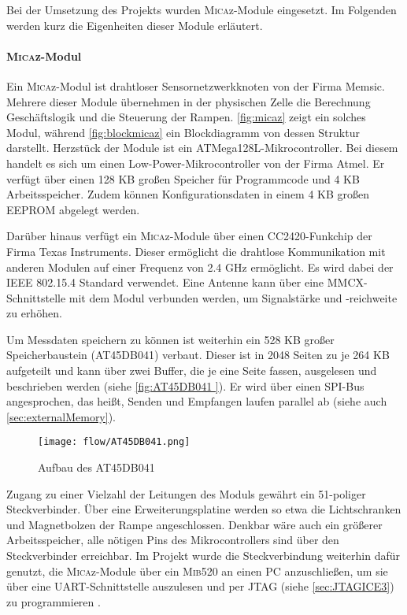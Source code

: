 Bei der Umsetzung des Projekts wurden \textsc{Mica}z-Module eingesetzt. Im Folgenden werden kurz die Eigenheiten dieser Module erläutert.

\paragraph{\textsc{Mica}z-Modul}
Ein \textsc{Mica}z-Modul ist drahtloser Sensornetzwerkknoten von der Firma Memsic. Mehrere dieser Module übernehmen in der physischen Zelle die Berechnung Geschäftslogik und die Steuerung der Rampen. \autoref{fig:micaz} zeigt ein solches Modul, während \autoref{fig:blockmicaz}  ein Blockdiagramm von dessen Struktur darstellt. Herzstück der Module ist ein ATMega128L-Mikrocontroller. Bei diesem handelt es sich um einen Low-Power-Mikrocontroller von der Firma Atmel. Er verfügt  über einen 128 KB großen Speicher für Programmcode und 4 KB Arbeitsspeicher. Zudem können Konfigurationsdaten in einem 4 KB großen EEPROM abgelegt werden.

Darüber hinaus verfügt ein \textsc{Mica}z-Module über einen CC2420-Funkchip der Firma Texas Instruments. Dieser ermöglicht die drahtlose Kommunikation mit anderen Modulen auf einer Frequenz von 2.4 GHz ermöglicht. Es wird dabei der IEEE 802.15.4 Standard verwendet. Eine Antenne kann über eine MMCX-Schnittstelle mit dem Modul verbunden werden, um Signalstärke und -reichweite zu erhöhen. 

Um Messdaten speichern zu können ist weiterhin ein 528 KB großer Speicherbaustein (AT45DB041) verbaut. Dieser ist in 2048 Seiten zu je 264 KB aufgeteilt und kann über zwei Buffer, die je eine Seite fassen, ausgelesen und beschrieben werden (siehe \autoref{fig:AT45DB041 }). Er wird über einen SPI-Bus angesprochen, das heißt, Senden und Empfangen laufen parallel ab (siehe auch \autoref{sec:externalMemory}).

\begin{figure}[th]
	\centering
		\texttt{[image: flow/AT45DB041.png]}
	\caption{Aufbau des AT45DB041 \cite{AT45DB041A:2014:Online}}
	\label{fig:AT45DB041 }
\end{figure}

Zugang zu einer Vielzahl der Leitungen des Moduls gewährt ein 51-poliger Steckverbinder. Über eine Erweiterungsplatine werden so etwa die Lichtschranken und Magnetbolzen der Rampe angeschlossen. Denkbar wäre auch ein größerer Arbeitsspeicher, alle nötigen Pins des Mikrocontrollers sind über den Steckverbinder erreichbar.
Im Projekt wurde die Steckverbindung weiterhin dafür genutzt, die \textsc{Mica}z-Module über ein \textsc{Mib}520 an einen PC anzuschließen, um sie über eine UART-Schnittstelle auszulesen und per JTAG (siehe \autoref{sec:JTAGICE3}) zu programmieren \cite{MICSHEET,C2420SHEET}.

